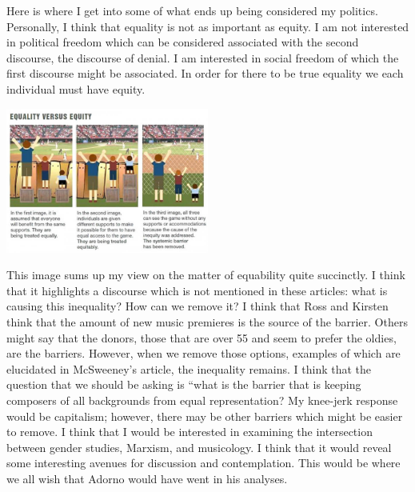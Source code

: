 \documentclass[12pt]{article}
\begin{document}
Here is where I get into some of what ends up being considered my
politics. Personally, I think that equality is not as important as
equity. I am not interested in political freedom which can be
considered associated with the second discourse, the discourse of
denial. I am interested in social freedom of which the first discourse
might be associated. In order for there to be true equality we each
individual must have equity.


\begin{center}
\includegraphics[width=0.5\textwidth]{equity.jpg}
\end{center}

\noindent This image sums up my view on the matter of equability quite
succinctly. I think that it highlights a discourse which is not
mentioned in these articles: what is causing this inequality? How can
we remove it? I think that Ross and Kirsten think that the amount of
new music premieres is the source of the barrier. Others might say
that the donors, those that are over 55 and seem to prefer the oldies,
are the barriers. However, when we remove those options, examples of
which are elucidated in McSweeney's article, the inequality remains. I
think that the question that we should be asking is ``what is the
barrier that is keeping composers of all backgrounds from equal
representation? My knee-jerk response would be capitalism; however,
there may be other barriers which might be easier to remove. I think
that I would be interested in examining the intersection between
gender studies, Marxism, and musicology. I think that it would reveal
some interesting avenues for discussion and contemplation. This would
be where we all wish that Adorno would have went in his analyses.

\end{document}
